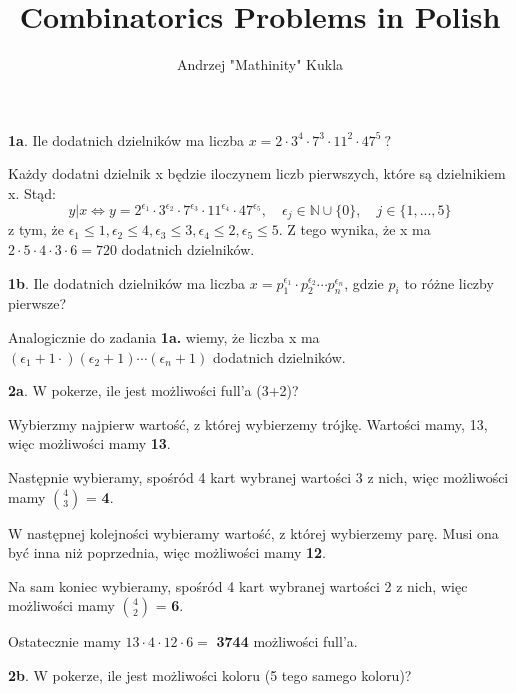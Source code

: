 \documentclass{article}
\title{Combinatorics Problems in Polish}
\author{Andrzej "Mathinity" Kukla}
\date{ }
\begin{document}
\maketitle
\begin{flushleft}
\large \textbf{1a}. Ile dodatnich dzielników ma liczba $x=2\cdot3^4\cdot7^3\cdot11^2\cdot47^5\ ?$
\end{flushleft}
\normalsize{}

Każdy dodatni dzielnik x będzie iloczynem liczb pierwszych, które są dzielnikiem x. Stąd: $$y|x\Leftrightarrow y=2^{\epsilon_1}\cdot3^{\epsilon_2}\cdot7^{\epsilon_3}\cdot11^{\epsilon_4}\cdot47^{\epsilon_5},\quad \epsilon_j\in\mathds{N}\cup\{0\},\quad j\in\{1,...,5\}$$
z tym, że $\epsilon_1\leq1,\epsilon_2\leq4,\epsilon_3\leq3,\epsilon_4\leq2,\epsilon_5\leq5$. Z tego wynika, że x ma $2\cdot5\cdot4\cdot3\cdot6=720$ dodatnich dzielników.

\begin{flushleft}
\large \textbf{1b}. Ile dodatnich dzielników ma liczba $x= p_1^{\epsilon_1}\cdot p_2^{\epsilon_2}\dotsb p_n^{\epsilon_n}$, gdzie $p_i$ to różne liczby pierwsze?
\end{flushleft}
\normalsize{}

Analogicznie do zadania \textbf{1a.} wiemy, że liczba x ma $(\epsilon_1+1\cdot)(\epsilon_2+1)\dotsb(\epsilon_n+1)$ dodatnich dzielników.

\begin{flushleft}
\large \textbf{2a}. W pokerze, ile jest możliwości full'a (3+2)?
\end{flushleft}
\normalsize{}

Wybierzmy najpierw wartość, z której wybierzemy trójkę. Wartości mamy, 13, więc możliwości mamy \textbf{13}.

Następnie wybieramy, spośród 4 kart wybranej wartości 3 z nich, więc możliwości mamy $4 \choose 3$ = \textbf{4}.

W następnej kolejności wybieramy wartość, z której wybierzemy parę. Musi ona być inna niż poprzednia, więc możliwości mamy \textbf{12}.

Na sam koniec wybieramy, spośród 4 kart wybranej wartości 2 z nich, więc możliwości mamy $4 \choose 2$ = \textbf{6}.

Ostatecznie mamy $13\cdot4\cdot12\cdot6=$ \textbf{3744} możliwości full'a.

\begin{flushleft}
\large \textbf{2b}. W pokerze, ile jest możliwości koloru (5 tego samego koloru)?
\end{flushleft}
\normalsize{}
\end{document}
